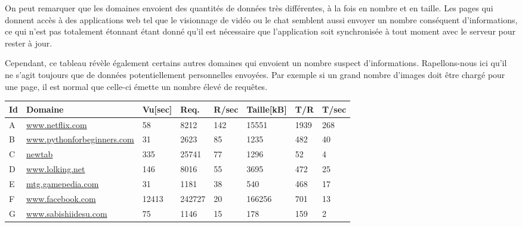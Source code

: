 			On peut remarquer que les domaines envoient des quantités de données très différentes, à la fois en nombre et en taille. Les pages qui donnent accès à des applications web tel que le visionnage de vidéo ou le chat semblent aussi envoyer un nombre conséquent d'informations, ce qui n'est pas totalement étonnant étant donné qu'il est nécessaire que l'application soit synchronisée à tout moment avec le serveur pour rester à jour.

			Cependant, ce tableau révèle également certains autres domaines qui envoient un nombre suspect d'informations. Rapellons-nous ici qu'il ne s'agit toujours que de données potentiellement personnelles envoyées. Par exemple si un grand nombre d'images doit être chargé pour une page, il est normal que celle-ci émette un nombre élevé de requêtes.

			\begin{table}[]
\centering
\begin{tabular}{llllllll}
\textbf{Id} & \textbf{Domaine}           & \textbf{Vu{[}sec{]}} & \textbf{Req.} & \textbf{R/sec} & \textbf{Taille{[}kB{]}} & \textbf{T/R} & \textbf{T/sec} \\ \hline
A & \scriptsize \url{www.netflix.com}            & 58                    & 8212          & 142                  & 15551                    & 1939         & 268            \\
B & \scriptsize \url{www.pythonforbeginners.com} & 31                    & 2623          & 85                   & 1235                     & 482          & 40             \\
C & \scriptsize \url{newtab}                     & 335                   & 25741         & 77                   & 1296                     & 52           & 4              \\
D & \scriptsize \url{www.lolking.net}            & 146                   & 8016          & 55                   & 3695                     & 472          & 25             \\
E & \scriptsize \url{mtg.gamepedia.com}          & 31                    & 1181          & 38                   & 540                      & 468          & 17             \\
F & \scriptsize \url{www.facebook.com}           & 12413                 & 242727        & 20                   & 166256                   & 701          & 13             \\
G & \scriptsize \url{www.sabishiidesu.com}       & 75                    & 1146          & 15                   & 178                      & 159          & 2              \\

\end{tabular}
\end{table}
